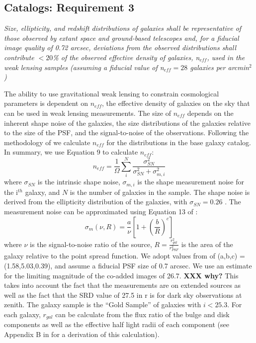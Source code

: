 \documentclass[]{article}
\begin{document}
{\subsection{Catalogs:  Requirement 3}

{\it Size, ellipticity, and redshift distributions of galaxies shall
  be representative of those observed by extant space and ground-based
  telescopes and, for a fiducial image quality of 0.72 arcsec,
  deviations from the observed distributions shall contribute $<20$\%
  of the observed effective density of galaxies, n$_{eff}$, used in
  the weak lensing samples (assuming a fiducial value of n$_{eff} =
  28$ galaxies per arcmin$^2$)}


The ability to use gravitational weak lensing to constrain
cosmological parameters is dependent on $n_{eff}$, the effective
density of galaxies on the sky that can be used in weak lensing
measurements. The size of $n_{eff}$ depends on the inherent shape
noise of the galaxies, the size distributions of the galaxies relative
to the size of the PSF, and the signal-to-noise of the observations.
Following  the methodology of \citet{chang} we
calculate $n_{eff}$ for the distributions in the 
base galaxy catalog.  In summary, we use Equation 9 to calculate $n_{eff}$:
\begin{equation}
n_{eff} = \frac{1}{\Omega}\sum^N_i\frac{\sigma^2_{SN}}{\sigma^2_{SN}+\sigma^2_{m,i}}
\end{equation}
where $\sigma_{SN}$ is the intrinsic shape noise, $\sigma_{m,i}$ is
the shape measurement noise for the i$^{th}$ galaxy, and $N$ is the
number of galaxies in the sample. The shape noise is derived from the
ellipticity distribution of the galaxies, with $\sigma_{SN} = 0.26$
\citep{chang}.  The measurement noise can be approximated using
Equation 13 of \citet{chang}:
\begin{equation}
\sigma_m(\nu,R) = \frac{a}{\nu}\left[1+\left(\frac{b}{R}\right)^c\right]
\end{equation}
where $\nu$ is the signal-to-noise ratio of the source,
$R=\frac{r_{gal}^2}{r_{PSF}^2}$ is the area of the galaxy relative to
the point spread function.  We adopt values from \citet{chang} of
(a,b,c) = (1.58,5.03,0.39), and assume a fiducial PSF size of 0.7
arcsec. We use an estimate for the limiting magnitude of the co-added
images of 26.7.  {\bf XXX why?} This takes into account the fact that
the measurements are on extended sources as well as the fact that the
SRD value of 27.5 in r is for dark sky observations at zenith.  The
galaxy sample is the ``Gold Sample'' of galaxies with $i < 25.3$.  For
each galaxy, $r_{gal}$ can be calculate from the flux ratio of the
bulge and disk components as well as the effective half light radii of
each component (see Appendix B in \citet{chang} for a derivation of
this calculation).

}
\end{document}
